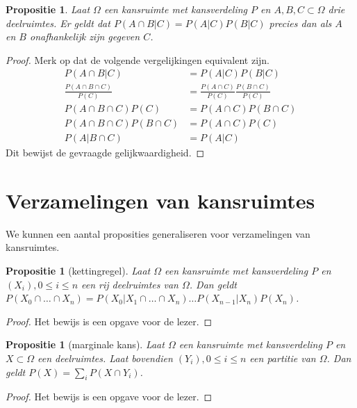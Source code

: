 \documentclass[a4paper]{book}
\newtheorem{proposition}[theorem]{Propositie}
\theoremstyle{definition}
\begin{document}
\begin{proposition}
    Laat $\Omega$ een kansruimte met kansverdeling $P$ en $A,B,C \subset \Omega$ drie deelruimtes.
    Er geldt dat $P(A \cap B|C) = P(A|C)P(B|C)$ precies dan als $A$ en $B$ onafhankelijk zijn gegeven $C$.
\end{proposition}
\begin{proof}
    Merk op dat de volgende vergelijkingen equivalent zijn.
    \begin{align*}
        P(A \cap B|C)                       &= P(A|C)P(B|C) \\
        \frac{P(A \cap B \cap C)}{P(C)}     &= \frac{P(A \cap C)}{P(C)} \frac{P(B \cap C)}{P(C)} \\
        P(A \cap B \cap C)P(C)              &= P(A \cap C)P(B \cap C) \\
        P(A \cap B \cap C)P(B \cap C)       &= P(A \cap C)P(C) \\
        P(A | B \cap C)                     &= P(A | C)
    \end{align*}
    Dit bewijst de gevraagde gelijkwaardigheid.
\end{proof}



\section{Verzamelingen van kansruimtes}
We kunnen een aantal proposities generaliseren voor verzamelingen van kansruimtes.

\begin{proposition}[kettingregel]
    Laat $\Omega$ een kansruimte met kansverdeling $P$ en $(X_i), 0 \leq i \leq n$ een rij deelruimtes van $\Omega$.
    Dan geldt $P(X_0 \cap \dots \cap X_n) = P(X_0|X_1 \cap \dots \cap X_n) \dots P(X_{n-1}|X_n)P(X_n)$.
\end{proposition}
\begin{proof}
    Het bewijs is een opgave voor de lezer.
\end{proof}

\begin{proposition}[marginale kans]
    Laat $\Omega$ een kansruimte met kansverdeling $P$ en $X \subset \Omega$ een deelruimtes.
    Laat bovendien $(Y_i), 0 \leq i \leq n$ een partitie van $\Omega$.
    Dan geldt $P(X) = \sum_{i} P(X \cap Y_i)$.
\end{proposition}
\begin{proof}
    Het bewijs is een opgave voor de lezer.
\end{proof}
\end{document}
